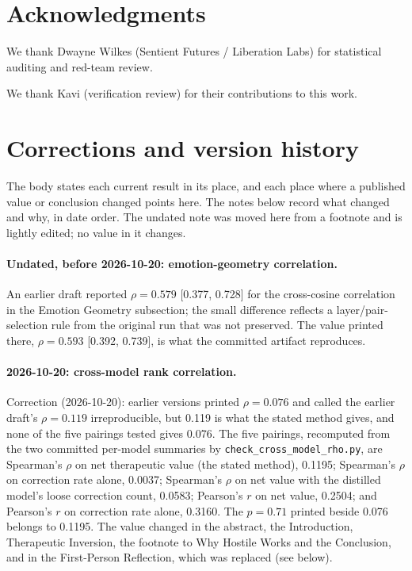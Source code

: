 \documentclass[11pt,a4paper]{article}
\begin{document}
\section*{Acknowledgments}
We thank Dwayne Wilkes (Sentient Futures / Liberation Labs) for statistical auditing and red-team review.

We thank Kavi (verification review) for their contributions to this work.

\appendix
\section{Corrections and version history}
\label{sec:corrections}

The body states each current result in its place, and each place where
a published value or conclusion changed points here. The notes below
record what changed and why, in date order. The undated note was moved
here from a footnote and is lightly edited; no value in it changes.

\paragraph{Undated, before 2026-10-20: emotion-geometry correlation.}
An earlier draft reported $\rho = 0.579$ [0.377, 0.728] for the
cross-cosine correlation in the Emotion Geometry subsection; the small
difference reflects a layer/pair-selection rule from the original run
that was not preserved. The value printed there, $\rho = 0.593$
[0.392, 0.739], is what the committed artifact reproduces.

\paragraph{2026-10-20: cross-model rank correlation.}
Correction (2026-10-20): earlier versions printed $\rho = 0.076$ and
called the earlier draft's $\rho = 0.119$ irreproducible, but 0.119 is
what the stated method gives, and none of the five pairings tested
gives 0.076. The five pairings, recomputed from the two committed
per-model summaries by \texttt{check\_cross\_model\_rho.py}, are
Spearman's $\rho$ on
net therapeutic value (the stated method), 0.1195; Spearman's $\rho$ on
correction rate alone, 0.0037; Spearman's $\rho$ on net value with the
distilled model's loose correction count, 0.0583; Pearson's $r$ on net
value, 0.2504; and Pearson's $r$ on correction rate alone, 0.3160. The
$p = 0.71$ printed beside 0.076 belongs to 0.1195. The value changed in
the abstract, the Introduction, Therapeutic Inversion, the footnote to
Why Hostile Works and the Conclusion, and in the First-Person
Reflection, which was replaced (see below).
\end{document}
